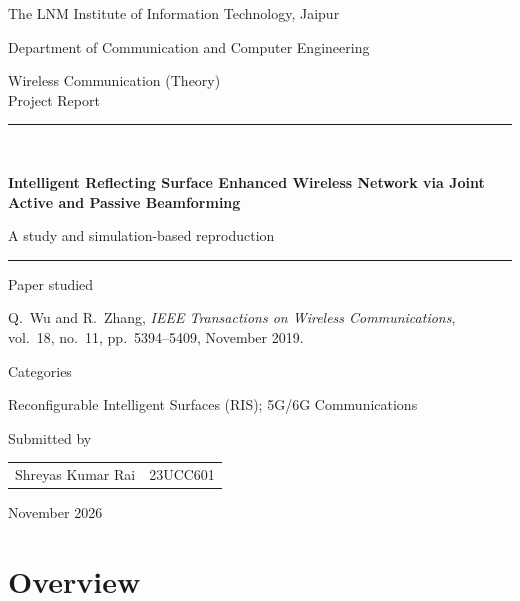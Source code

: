 \documentclass[11pt,a4paper]{article}
\begin{document}
\begin{titlepage}
\centering
{\large The LNM Institute of Information Technology, Jaipur\par}
{\large Department of Communication and Computer Engineering\par}
\vspace{2.5cm}
{\Large Wireless Communication (Theory) \\[2pt] Project Report\par}
\vspace{1.5cm}
\rule{\linewidth}{0.6pt}\\[10pt]
{\LARGE\bfseries Intelligent Reflecting Surface Enhanced Wireless Network via Joint Active and Passive Beamforming\par}
\vspace{6pt}
{\large A study and simulation-based reproduction\par}
\rule{\linewidth}{0.6pt}
\vspace{1.2cm}

{\large Paper studied\par}
\vspace{4pt}
Q.~Wu and R.~Zhang, \emph{IEEE Transactions on Wireless Communications},\\
vol.~18, no.~11, pp.~5394--5409, November 2019.

\vspace{0.6cm}
{\large Categories\par}
\vspace{4pt}
Reconfigurable Intelligent Surfaces (RIS); 5G/6G Communications

\vfill
{\large Submitted by\par}
\vspace{6pt}
\begin{tabular}{ll}
Shreyas Kumar Rai & 23UCC601 \\
\end{tabular}

\vspace{1.5cm}
{\large November 2026\par}
\end{titlepage}

\tableofcontents
\newpage

\section{Overview}
\end{document}
